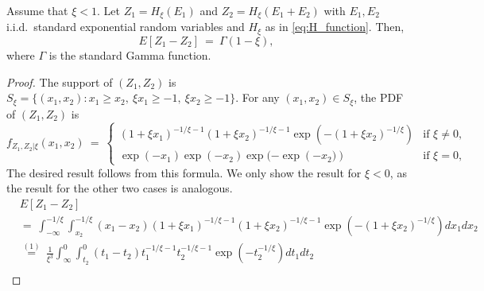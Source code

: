 \begin{lemma}\label{lem:sp-surplus}
Assume that $\xi<1$. Let $Z_1 = H_{\xi} (E_{1}) $ and $Z_2=H_{\xi }( E_{1}+E_{2}) $ with $E_{1},E_{2}$ i.i.d.\ standard exponential random variables and $H_{\xi }$ as in \eqref{eq:H_function}. Then,
\begin{equation*}
    E[Z_1 - Z_2] ~=~\Gamma (1-\xi ),
\end{equation*}
where $\Gamma$ is the standard Gamma function.
\end{lemma}
\begin{proof}
The support of $(Z_{1},Z_{2})$ is $S_{\xi }=\{(x_{1},x_{2}):x_{1}\geq x_{2},~\xi x_{1}\geq -1,~\xi x_{2}\geq -1\}$. For any $(x_{1},x_{2}) \in S_{\xi}$, the PDF of $(Z_{1},Z_{2})$ is 
\begin{equation*}
f_{Z_{1},Z_{2}|\xi }(x_{1},x_{2})~=~
\left\{ 
\begin{array}{lc}
(1+\xi x_{1})^{-1/\xi -1}(1+\xi x_{2})^{-1/\xi -1}\exp ( -( 1+\xi x_{2}) ^{-1/\xi })  & \text{if }\xi \neq 0, \\ 
\exp({-x_{1}})\exp({-x_{2}})\exp({-\exp({-x_{2})})} & \text{if }\xi =0,%
\end{array}%
\right. 
\end{equation*}%
The desired result follows from this formula. We only show the result for $\xi <0$, as the result for the other two cases is analogous. 
\begin{align*}
&E[ Z_{1}-Z_{2}] \\
&=~\int_{-\infty }^{-1/\xi}\int_{x_{2}}^{-1/\xi }( x_{1}-x_{2}) (1+\xi x_{1})^{-1/\xi-1}(1+\xi x_{2})^{-1/\xi -1}\exp ( -( 1+\xi x_{2}) ^{-1/\xi}) dx_{1}dx_{2} \\
&\overset{(1)}{=}~\frac{1}{\xi ^{3}}\int_{\infty }^{0}\int_{t_{2}}^{0}(t_{1}-t_{2}) t_{1}^{-1/\xi -1}t_{2}^{-1/\xi -1}\exp (-t_{2}^{-1/\xi }) dt_{1}dt_{2} \\

\end{align*}
\end{proof}
